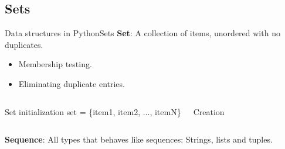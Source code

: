 \documentclass[10pt,compress]{beamer} %
\begin{document}
\subsection{Sets}
\begin{frame}{Data structures in Python}{Sets}
\vspace{-0.2cm}
	\textbf{Set}: A collection of items, unordered with no duplicates.
		\begin{itemize}
		\item \small{Membership testing.}
		\item \small{Eliminating duplicate entries.}
		\end{itemize}
\vspace{-0.2cm}
    \begin{columns}

		\begin{block}{Set initialization}
        set = \{item1, item2, ..., itemN\}
		\end{block}

		
%		

 	  \scriptsize{
 	   \begin{exampleblock}{Creation}
		\vspace{-0.2cm}
		
		
		\vspace{-0.2cm}
		
		\end{exampleblock}
		\vspace{0.3cm}
		}
	\end{columns}
	\vspace{0.1cm}
\small{\textbf{Sequence}: All types that behaves like sequences: Strings, lists and tuples.}
\end{frame}

	

%		
\end{document}
